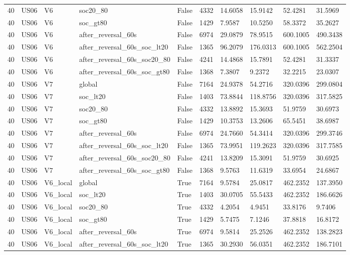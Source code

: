 \begin{tabular}{llllllllll}
40 & US06 & V6 & soc20\_80 & False & 4332 & 14.6058 & 15.9142 & 52.4281 & 31.5969 \\
40 & US06 & V6 & soc\_gt80 & False & 1429 & 7.9587 & 10.5250 & 58.3372 & 35.2627 \\
40 & US06 & V6 & after\_reversal\_60s & False & 6974 & 29.0879 & 78.9515 & 600.1005 & 490.3438 \\
40 & US06 & V6 & after\_reversal\_60s\_soc\_lt20 & False & 1365 & 96.2079 & 176.0313 & 600.1005 & 562.2504 \\
40 & US06 & V6 & after\_reversal\_60s\_soc20\_80 & False & 4241 & 14.4868 & 15.7891 & 52.4281 & 31.3337 \\
40 & US06 & V6 & after\_reversal\_60s\_soc\_gt80 & False & 1368 & 7.3807 & 9.2372 & 32.2215 & 23.0307 \\
40 & US06 & V7 & global & False & 7164 & 24.9378 & 54.2716 & 320.0396 & 299.0804 \\
40 & US06 & V7 & soc\_lt20 & False & 1403 & 73.8844 & 118.8756 & 320.0396 & 317.5825 \\
40 & US06 & V7 & soc20\_80 & False & 4332 & 13.8892 & 15.3693 & 51.9759 & 30.6973 \\
40 & US06 & V7 & soc\_gt80 & False & 1429 & 10.3753 & 13.2606 & 65.5451 & 38.6987 \\
40 & US06 & V7 & after\_reversal\_60s & False & 6974 & 24.7660 & 54.3414 & 320.0396 & 299.3746 \\
40 & US06 & V7 & after\_reversal\_60s\_soc\_lt20 & False & 1365 & 73.9951 & 119.2623 & 320.0396 & 317.7585 \\
40 & US06 & V7 & after\_reversal\_60s\_soc20\_80 & False & 4241 & 13.8209 & 15.3091 & 51.9759 & 30.6925 \\
40 & US06 & V7 & after\_reversal\_60s\_soc\_gt80 & False & 1368 & 9.5763 & 11.6319 & 33.6954 & 24.6867 \\
40 & US06 & V6\_local & global & True & 7164 & 9.5784 & 25.0817 & 462.2352 & 137.3950 \\
40 & US06 & V6\_local & soc\_lt20 & True & 1403 & 30.0705 & 55.5433 & 462.2352 & 186.6626 \\
40 & US06 & V6\_local & soc20\_80 & True & 4332 & 4.2054 & 4.9451 & 33.8176 & 9.7406 \\
40 & US06 & V6\_local & soc\_gt80 & True & 1429 & 5.7475 & 7.1246 & 37.8818 & 16.8172 \\
40 & US06 & V6\_local & after\_reversal\_60s & True & 6974 & 9.5814 & 25.2526 & 462.2352 & 138.2823 \\
40 & US06 & V6\_local & after\_reversal\_60s\_soc\_lt20 & True & 1365 & 30.2930 & 56.0351 & 462.2352 & 186.7101 \\

\end{tabular}
